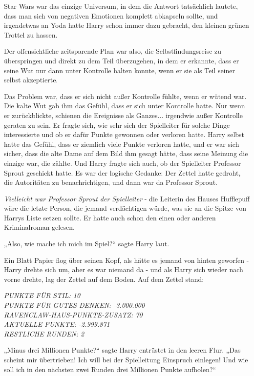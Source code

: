 {Star Wars war das einzige Universum, in dem die Antwort tatsächlich lautete, dass man sich von negativen Emotionen komplett abkapseln sollte, und irgendetwas an Yoda hatte Harry schon immer dazu gebracht, den kleinen grünen Trottel zu hassen.

Der offensichtliche zeitsparende Plan war also, die Selbstfindungsreise zu überspringen und direkt zu dem Teil überzugehen, in dem er erkannte, dass er seine Wut nur dann unter Kontrolle halten konnte, wenn er sie als Teil seiner selbst akzeptierte.

Das Problem war, dass er sich nicht außer Kontrolle fühlte, wenn er wütend war. Die kalte Wut gab ihm das Gefühl, dass er sich unter Kontrolle hatte. Nur wenn er zurückblickte, schienen die Ereignisse als Ganzes... irgendwie außer Kontrolle geraten zu sein. Er fragte sich, wie sehr sich der Spielleiter für solche Dinge interessierte und ob er dafür Punkte gewonnen oder verloren hatte. Harry selbst hatte das Gefühl, dass er ziemlich viele Punkte verloren hatte, und er war sich sicher, dass die alte Dame auf dem Bild ihm gesagt hätte, dass seine Meinung die einzige war, die zählte. Und Harry fragte sich auch, ob der Spielleiter Professor Sprout geschickt hatte. Es war der logische Gedanke: Der Zettel hatte gedroht, die Autoritäten zu benachrichtigen, und dann war da Professor Sprout.

\emph{Vielleicht war Professor Sprout der Spielleiter} - die Leiterin des Hauses Hufflepuff wäre die letzte Person, die jemand verdächtigen würde, was sie an die Spitze von Harrys Liste setzen sollte. Er hatte auch schon den einen oder anderen Kriminalroman gelesen.

„Also, wie mache ich mich im Spiel?“ sagte Harry laut.

Ein Blatt Papier flog über seinen Kopf, als hätte es jemand von hinten geworfen - Harry drehte sich um, aber es war niemand da - und als Harry sich wieder nach vorne drehte, lag der Zettel auf dem Boden. Auf dem Zettel stand:

\emph{PUNKTE FÜR STIL: 10}\\ \emph{PUNKTE FÜR GUTES DENKEN: -3.000.000}\\ \emph{RAVENCLAW-HAUS-PUNKTE-ZUSATZ: 70}\\ \emph{AKTUELLE PUNKTE: -2.999.871}\\ \emph{RESTLICHE RUNDEN: 2}

„Minus drei Millionen Punkte?“ sagte Harry entrüstet in den leeren Flur. „Das scheint mir übertrieben! Ich will bei der Spielleitung Einspruch einlegen! Und wie soll ich in den nächsten zwei Runden drei Millionen Punkte aufholen?“

}
